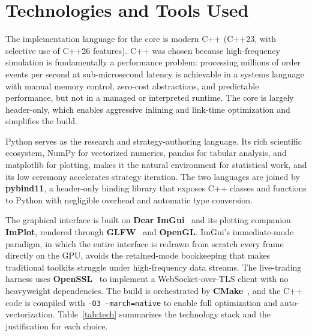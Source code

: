 \documentclass[12pt,oneside,a4paper]{report}
\begin{document}
\section{Technologies and Tools Used}
\label{sec:technologies}

The implementation language for the core is modern C++ (C++23, with selective use of C++26 features). C++ was chosen because high-frequency simulation is fundamentally a performance problem: processing millions of order events per second at sub-microsecond latency is achievable in a systems language with manual memory control, zero-cost abstractions, and predictable performance, but not in a managed or interpreted runtime. The core is largely header-only, which enables aggressive inlining and link-time optimization and simplifies the build.

Python serves as the research and strategy-authoring language. Its rich scientific ecosystem, NumPy for vectorized numerics, pandas for tabular analysis, and matplotlib for plotting, makes it the natural environment for statistical work, and its low ceremony accelerates strategy iteration. The two languages are joined by \textbf{pybind11}, a header-only binding library that exposes C++ classes and functions to Python with negligible overhead and automatic type conversion.

The graphical interface is built on \textbf{Dear ImGui}~\cite{imgui} and its plotting companion \textbf{ImPlot}, rendered through \textbf{GLFW}~\cite{glfw} and \textbf{OpenGL}. ImGui's immediate-mode paradigm, in which the entire interface is redrawn from scratch every frame directly on the GPU, avoids the retained-mode bookkeeping that makes traditional toolkits struggle under high-frequency data streams. The live-trading harness uses \textbf{OpenSSL}~\cite{openssl} to implement a WebSocket-over-TLS client with no heavyweight dependencies. The build is orchestrated by \textbf{CMake}~\cite{cmake}, and the C++ code is compiled with \texttt{-O3 -march=native} to enable full optimization and auto-vectorization. Table~\ref{tab:tech} summarizes the technology stack and the justification for each choice.
\end{document}
